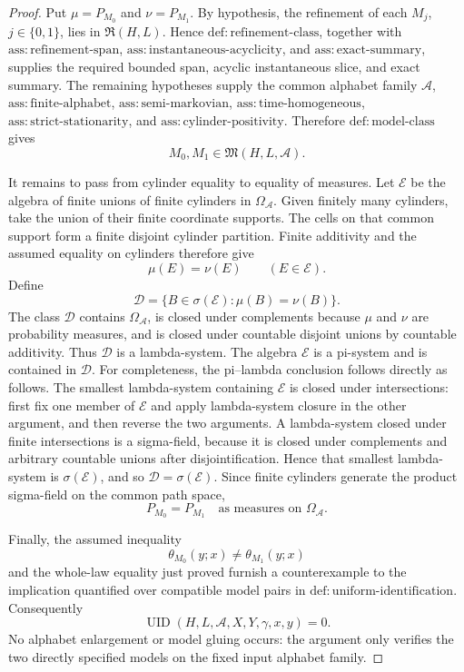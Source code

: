 \documentclass{article}
\begin{document}
\begin{proof}
Put \(\mu=P_{M_0}\) and \(\nu=P_{M_1}\).  By hypothesis, the refinement of each \(M_j\), \(j\in\{0,1\}\), lies in \(\mathfrak R(H,L)\).  Hence \(\mathrm{def:refinement\text{-}class}\), together with \(\mathrm{ass:refinement\text{-}span}\), \(\mathrm{ass:instantaneous\text{-}acyclicity}\), and \(\mathrm{ass:exact\text{-}summary}\), supplies the required bounded span, acyclic instantaneous slice, and exact summary.  The remaining hypotheses supply the common alphabet family \(\mathcal A\), \(\mathrm{ass:finite\text{-}alphabet}\), \(\mathrm{ass:semi\text{-}markovian}\), \(\mathrm{ass:time\text{-}homogeneous}\), \(\mathrm{ass:strict\text{-}stationarity}\), and \(\mathrm{ass:cylinder\text{-}positivity}\).  Therefore \(\mathrm{def:model\text{-}class}\) gives
\[
 M_0,M_1\in\mathfrak M(H,L,\mathcal A).
\]

It remains to pass from cylinder equality to equality of measures.  Let \(\mathscr E\) be the algebra of finite unions of finite cylinders in \(\Omega_{\mathcal A}\).  Given finitely many cylinders, take the union of their finite coordinate supports.  The cells on that common support form a finite disjoint cylinder partition.  Finite additivity and the assumed equality on cylinders therefore give
\[
 \mu(E)=\nu(E)\qquad(E\in\mathscr E).
\]
Define
\[
 \mathscr D=\{B\in\sigma(\mathscr E):\mu(B)=\nu(B)\}.
\]
The class \(\mathscr D\) contains \(\Omega_{\mathcal A}\), is closed under complements because \(\mu\) and \(\nu\) are probability measures, and is closed under countable disjoint unions by countable additivity.  Thus \(\mathscr D\) is a lambda-system.  The algebra \(\mathscr E\) is a pi-system and is contained in \(\mathscr D\).  For completeness, the pi--lambda conclusion follows directly as follows.  The smallest lambda-system containing \(\mathscr E\) is closed under intersections: first fix one member of \(\mathscr E\) and apply lambda-system closure in the other argument, and then reverse the two arguments.  A lambda-system closed under finite intersections is a sigma-field, because it is closed under complements and arbitrary countable unions after disjointification.  Hence that smallest lambda-system is \(\sigma(\mathscr E)\), and so \(\mathscr D=\sigma(\mathscr E)\).  Since finite cylinders generate the product sigma-field on the common path space,
\[
 P_{M_0}=P_{M_1}\quad\text{as measures on }\Omega_{\mathcal A}.
\]

Finally, the assumed inequality
\[
 \theta_{M_0}(y;x)\ne\theta_{M_1}(y;x)
\]
and the whole-law equality just proved furnish a counterexample to the implication quantified over compatible model pairs in \(\mathrm{def:uniform\text{-}identification}\).  Consequently
\[
 \operatorname{UID}(H,L,\mathcal A,X,Y,\gamma,x,y)=0.
\]
No alphabet enlargement or model gluing occurs: the argument only verifies the two directly specified models on the fixed input alphabet family.
\end{proof}
\end{document}
